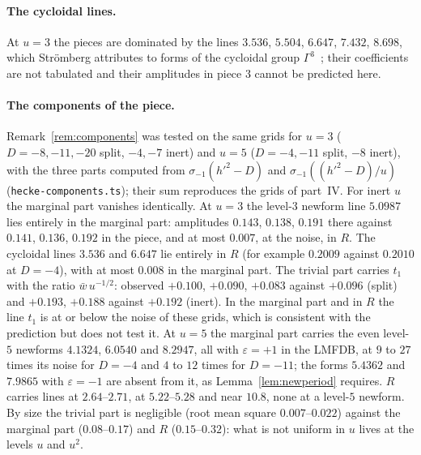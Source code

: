 \documentclass[11pt,a4paper]{article}
\theoremstyle{remark}\newtheorem{remark}[theorem]{Remark}
\begin{document}
\paragraph{The cycloidal lines.} At $u=3$ the pieces are dominated by the lines $3.536$, $5.504$, $6.647$, $7.432$, $8.698$,
which Str\"omberg attributes to forms of the cycloidal group $\Gamma^3$~\cite{Stromberg2012}; their coefficients are not
tabulated and their amplitudes in piece $3$ cannot be predicted here.

\paragraph{The components of the piece.} Remark~\ref{rem:components} was tested on the same grids for $u=3$ ($D=-8,-11,-20$ split,
$-4,-7$ inert) and $u=5$ ($D=-4,-11$ split, $-8$ inert), with the three parts computed from $\sigma_{-1}(h'^2-D)$ and
$\sigma_{-1}((h'^2-D)/u)$ (\texttt{hecke-components.ts}); their sum reproduces the grids of part~IV. For inert $u$ the marginal part
vanishes identically. At $u=3$ the level-$3$ newform line $5.0987$ lies entirely in the marginal part: amplitudes $0.143$, $0.138$,
$0.191$ there against $0.141$, $0.136$, $0.192$ in the piece, and at most $0.007$, at the noise, in $R$. The cycloidal lines $3.536$
and $6.647$ lie entirely in $R$ (for example $0.2009$ against $0.2010$ at $D=-4$), with at most $0.008$ in the marginal part. The
trivial part carries $t_1$ with the ratio $\bar w\,u^{-1/2}$: observed $+0.100$, $+0.090$, $+0.083$ against $+0.096$ (split) and
$+0.193$, $+0.188$ against $+0.192$ (inert). In the marginal part and in $R$ the line $t_1$ is at or below the noise of these grids,
which is consistent with the prediction but does not test it. At $u=5$ the marginal part carries the even level-$5$ newforms
$4.1324$, $6.0540$ and $8.2947$, all with $\varepsilon=+1$ in the LMFDB, at $9$ to $27$ times its noise for $D=-4$ and $4$ to $12$ times
for $D=-11$; the forms $5.4362$ and $7.9865$ with $\varepsilon=-1$ are absent from it, as Lemma~\ref{lem:newperiod} requires. $R$
carries lines at $2.64$--$2.71$, at $5.22$--$5.28$ and near $10.8$, none at a level-$5$ newform. By size the trivial part is negligible
(root mean square $0.007$--$0.022$) against the marginal part ($0.08$--$0.17$) and $R$ ($0.15$--$0.32$): what is not uniform in $u$
lives at the levels $u$ and $u^2$.
\end{document}
